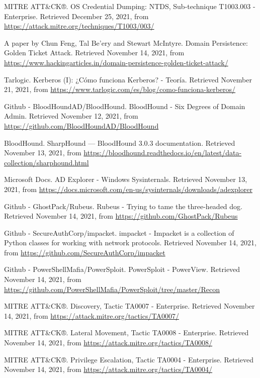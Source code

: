 \begin{thebibliography}{99}
MITRE ATT\&CK®.
OS Credential Dumping: NTDS, Sub-technique T1003.003 - Enterprise.	
Retrieved December 25, 2021, from \url{https://attack.mitre.org/techniques/T1003/003/}

A paper by Chun Feng, Tal Be’ery and Stewart McIntyre.
Domain Persistence: Golden Ticket Attack.
Retrieved November 14, 2021, from \url{https://www.hackingarticles.in/domain-persistence-golden-ticket-attack/}

Tarlogic.
Kerberos (I): ¿Cómo funciona Kerberos? - Teoría.
Retrieved November 21, 2021, from \url{https://www.tarlogic.com/es/blog/como-funciona-kerberos/}


Github - BloodHoundAD/BloodHound. 
BloodHound - Six Degrees of Domain Admin.
Retrieved November 12, 2021, from \url{https://github.com/BloodHoundAD/BloodHound}

BloodHound. 
SharpHound — BloodHound 3.0.3 documentation.
Retrieved November 13, 2021, from \url{https://bloodhound.readthedocs.io/en/latest/data-collection/sharphound.html}

Microsoft Docs. 
AD Explorer - Windows Sysinternals.
Retrieved November 13, 2021, from \url{https://docs.microsoft.com/en-us/sysinternals/downloads/adexplorer}


Github - GhostPack/Rubeus.
Rubeus - Trying to tame the three-headed dog.
Retrieved November 14, 2021, from \url{https://github.com/GhostPack/Rubeus}

Github - SecureAuthCorp/impacket.
impacket - Impacket is a collection of Python classes for working with network protocols.
Retrieved November 14, 2021, from \url{https://github.com/SecureAuthCorp/impacket}

Github - PowerShellMafia/PowerSploit.
PowerSploit - PowerView.
Retrieved November 14, 2021, from \url{https://github.com/PowerShellMafia/PowerSploit/tree/master/Recon}

MITRE ATT\&CK®.
Discovery, Tactic TA0007 - Enterprise.
Retrieved November 14, 2021, from \url{https://attack.mitre.org/tactics/TA0007/}

MITRE ATT\&CK®.
Lateral Movement, Tactic TA0008 - Enterprise.
Retrieved November 14, 2021, from \url{https://attack.mitre.org/tactics/TA0008/}

MITRE ATT\&CK®.
Privilege Escalation, Tactic TA0004 - Enterprise.
Retrieved November 14, 2021, from \url{https://attack.mitre.org/tactics/TA0004/}



\end{thebibliography}
